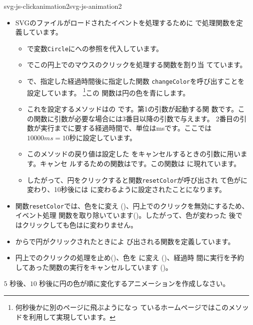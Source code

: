 {}
{svg-js-clickanimation2}{svg-js-animation2}
\begin{itemize}
 \item SVGのファイルがロードされたイベントを処理するために
			 で処理関数を定義しています。
	\begin{itemize}
	 \item {}で変数\texttt{Circle}にへの参照を代入しています。
	 \item {}でこの円上でのマウスのクリックを処理する関数を割り当
       てています。
	 \item {}で、指定した経過時間後に指定した関数
       \texttt{changeColor}を呼び出すことを設定しています。
       \footnote{何秒後かに別のページに飛ぶようになっ
       ているホームページではこのメソッドを利用して実現しています。}この
       関数は円の色を青にします。
	 \item これを設定するメソッドはの
       です。第1の引数が起動する関
       数です。この関数に引数が必要な場合には3番目以降の引数で与えます。
         2番目の引数が実行までに要する経過時間で、単位はmsです。ここでは
         $10000ms = 10秒$に設定しています。
	 \item このメソッドの戻り値は設定した
       をキャンセルするときの引数に用います。キャンセ
       ルするための関数はです。この関数は
       に現れています。
 \item したがって、円をクリックすると関数\texttt{resetColor}が呼び出され
       て色がに変わり、10秒後には
       に変わるように設定されたことになります。
			 \end{itemize}
 \item 関数\texttt{resetColor}では、色をに変え
       ()、円上でのクリックを無効にするため、イベント処理
       関数を取り除いています()。したがって、色が変わった
       後ではクリックしても色はに変わりません。
 \item {}からで円がクリックされたときによ
       び出される関数を定義しています。
 \item 円上でのクリックの処理を止め()、色を
       に変え
       ()、経過時
       間に実行を予約してあった関数の実行をキャンセルしています
       ()。
			 \end{itemize}
\begin{Problem}\upshape
$5$  秒後、$10$ 秒後に円の色が順に変化するアニメーションを作成しなさい。
\end{Problem}
